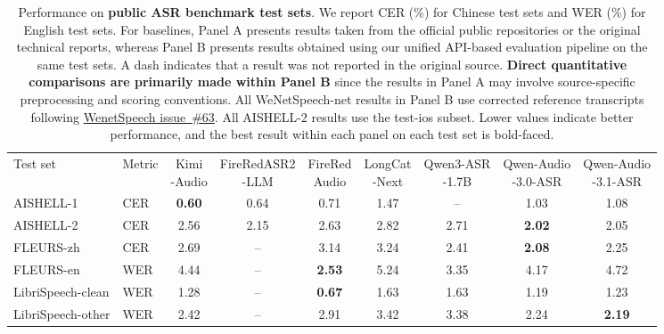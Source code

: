 \documentclass{article}
\begin{document}
\begin{table}[t]
\centering
\caption{Performance on \textbf{public ASR benchmark test sets}.
We report CER (\%) for Chinese test sets and WER (\%) for English test sets.
For baselines, Panel A presents results taken from the official public
repositories or the original technical reports, whereas Panel B presents results obtained
using our unified API-based evaluation pipeline on the same test sets. A dash indicates that a result was not reported in the original source. \textbf{Direct quantitative
comparisons are primarily made within Panel B} since the results in Panel A may involve
source-specific preprocessing and scoring conventions. All WeNetSpeech-net results in Panel B use corrected reference transcripts following \href{https://github.com/wenet-e2e/WenetSpeech/issues/63}{WenetSpeech issue~\#63}. All AISHELL-2 results use the test-ios subset.
%
Lower values indicate better performance, and the best result within each panel
on each test set is bold-faced.}
\label{tab:asr-os}
\scriptsize
\setlength{\tabcolsep}{3.5pt}
\renewcommand{\arraystretch}{1.13}
%
%
\begin{tabular*}{\textwidth}{@{\extracolsep{\fill}}llccccccc@{}}
\toprule
\rowcolor{QwenPurpleLight}
\multicolumn{9}{c}{\color{QwenPurple}\bfseries Panel A: Published Benchmark Results} \\
\midrule
Test set & Metric & \shortstack{Kimi\\-Audio} & \shortstack{FireRedASR2\\-LLM} & \shortstack{FireRed\\Audio} & \shortstack{LongCat\\-Next} & \shortstack{Qwen3-ASR\\-1.7B} & \shortstack{Qwen-Audio\\-3.0-ASR} & \shortstack{Qwen-Audio\\-3.1-ASR} \\
\midrule
AISHELL-1 & CER & \textbf{0.60} & 0.64 & 0.71 & 1.47 & -- & 1.03 & 1.08 \\
AISHELL-2 & CER & 2.56 & 2.15 & 2.63 & 2.82 & 2.71 & \textbf{2.02} & 2.05 \\
FLEURS-zh & CER & 2.69 & -- & 3.14 & 3.24 & 2.41 & \textbf{2.08} & 2.25 \\
FLEURS-en & WER & 4.44 & -- & \textbf{2.53} & 5.24 & 3.35 & 4.17 & 4.72 \\
LibriSpeech-clean & WER & 1.28 & -- & \textbf{0.67} & 1.63 & 1.63 & 1.19 & 1.23 \\
LibriSpeech-other & WER & 2.42 & -- & 2.91 & 3.42 & 3.38 & 2.24 & \textbf{2.19} \\

\end{tabular*}
\end{table}
\end{document}
